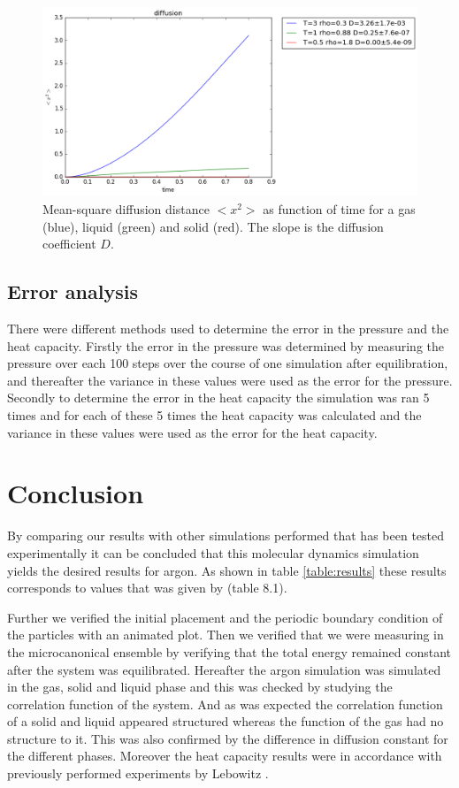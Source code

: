 \documentclass[12pt,a4paper]{report}
\begin{document}
\begin{figure}[H]
\centering
\includegraphics[scale=0.5]{diffusion.png}
\caption{Mean-square diffusion distance $<x^2>$ as function of time for a gas (blue), liquid (green) and solid (red). The slope is the diffusion coefficient $D$.}
\label{fig:diffusion}
\end{figure}

\section{Error analysis}

There were different methods used to determine the error in the pressure and the heat capacity. Firstly the error in the pressure was determined by measuring the pressure over each 100 steps over the course of one simulation after equilibration, and thereafter the variance in these values were used as the error for the pressure. Secondly to determine the error in the heat capacity the simulation was ran 5 times and for each of these 5 times the heat capacity was calculated and the variance in these values were used as the error for the heat capacity.

\chapter{Conclusion}

By comparing our results with other simulations performed that has been tested experimentally it can be concluded that this molecular dynamics simulation yields the desired results for argon. As shown in table \ref{table:results} these results corresponds to values that was given by \cite{thijssen} (table 8.1).

Further we verified the initial placement and the periodic boundary condition of the particles with an animated plot. Then we verified that we were measuring in the microcanonical ensemble by verifying that the total energy remained constant after the system was equilibrated. Hereafter the argon simulation was simulated in the gas, solid and liquid phase and this was checked by studying the correlation function of the system. And as was expected the correlation function of a solid and liquid appeared structured whereas the function of the gas had no structure to it.
This was also confirmed by the difference in diffusion constant for the different phases.
Moreover the heat capacity results were in accordance with previously performed experiments by Lebowitz \cite{lebowitz1967}. 
\end{document}
